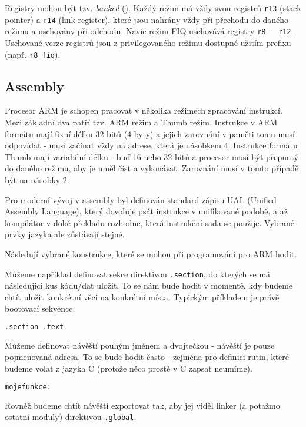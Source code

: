 \documentclass{article}
\begin{document}
Registry mohou být tzv. \emph{banked} (). Každý režim má vždy svou  registrů \texttt{r13} (stack pointer) a \texttt{r14} (link register), které jsou nahrány vždy při přechodu do daného režimu a uschovány při odchodu. Navíc režim FIQ uschovává registry \texttt{r8 - r12}. Uschované verze registrů jsou z privilegovaného režimu dostupné užitím prefixu (např. \texttt{r8\_fiq}).

\subsection{Assembly}

Procesor ARM je schopen pracovat v několika režimech zpracování instrukcí. Mezi základní dva patří tzv. ARM režim a Thumb režim. Instrukce v ARM formátu mají fixní délku 32 bitů (4 byty) a jejich zarovnání v paměti tomu musí odpovídat - musí začínat vždy na adrese, která je násobkem 4. Instrukce formátu Thumb mají variabilní délku - buď 16 nebo 32 bitů a procesor musí být přepnutý do daného režimu, aby je uměl číst a vykonávat. Zarovnání musí v tomto případě být na násobky 2.

Pro moderní vývoj v assembly byl definován standard zápisu UAL (Unified Assembly Language), který dovoluje psát instrukce v unifikované podobě, a až kompilátor v době překladu rozhodne, která instrukční sada se použije. Vybrané prvky jazyka ale zůstávají stejné.

Následují vybrané konstrukce, které se mohou při programování pro ARM hodit.

Můžeme například definovat sekce direktivou \texttt{.section}, do kterých se má následující kus kódu/dat uložit. To se nám bude hodit v momentě, kdy budeme chtít uložit konkrétní věci na konkrétní místa. Typickým příkladem je právě bootovací sekvence.

\begin{lstlisting}[language=C]
.section .text
\end{lstlisting}

Můžeme definovat návěští pouhým jménem a dvojtečkou - návěští je pouze pojmenovaná adresa. To se bude hodit často - zejména pro definici rutin, které budeme volat z jazyka C (protože něco prostě v C zapsat neumíme).

\begin{lstlisting}[language=C]
mojefunkce:
\end{lstlisting}

Rovněž budeme chtít návěští exportovat tak, aby jej viděl linker (a potažmo ostatní moduly) direktivou \texttt{.global}.
\end{document}
